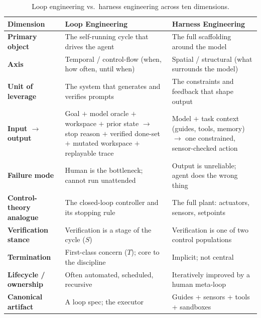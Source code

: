 \documentclass[10pt,twocolumn,letterpaper]{article}
\begin{document}
\begin{table}[t]
\centering
\caption{Loop engineering vs.\ harness engineering across ten dimensions.}
\label{tab:compare}
\small
\renewcommand{\arraystretch}{1.15}
\begin{tabular}{@{}>{\bfseries}p{} p{} p{}@{}}
\toprule
Dimension & Loop Engineering & Harness Engineering \\
\midrule
Primary object      & The self-running cycle that drives the agent        & The full scaffolding around the model \\
Axis                & Temporal / control-flow (when, how often, until when) & Spatial / structural (what surrounds the model) \\
Unit of leverage    & The system that generates and verifies prompts       & The constraints and feedback that shape output \\
Input $\rightarrow$ output & Goal $+$ model oracle $+$ workspace $+$ prior state $\rightarrow$ stop reason $+$ verified done-set $+$ mutated workspace $+$ replayable trace & Model $+$ task context (guides, tools, memory) $\rightarrow$ one constrained, sensor-checked action \\
Failure mode        & Human is the bottleneck; cannot run unattended       & Output is unreliable; agent does the wrong thing \\
Control-theory analogue & The closed-loop controller and its stopping rule & The full plant: actuators, sensors, setpoints \\
Verification stance & Verification is a stage of the cycle ($S$)           & Verification is one of two control populations \\
Termination         & First-class concern ($T$); core to the discipline    & Implicit; not central \\
Lifecycle / ownership & Often automated, scheduled, recursive              & Iteratively improved by a human meta-loop \\
Canonical artifact  & A loop spec; the executor                            & Guides + sensors + tools + sandboxes \\
\bottomrule
\end{tabular}
\end{table}
\end{document}
